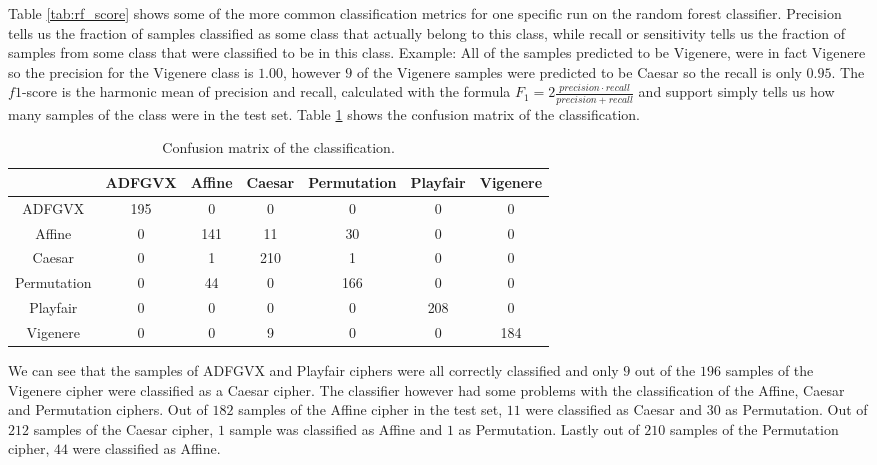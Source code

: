 \documentclass[a4paper]{article}
\begin{document}
Table \ref{tab:rf_score} shows some of the more common classification metrics for one specific run on the random forest classifier. Precision tells us the fraction of samples classified as some class that actually belong to this class, while recall or sensitivity tells us the fraction of samples from some class that were classified to be in this class. Example: All of the samples predicted to be Vigenere, were in fact Vigenere so the precision for the Vigenere class is $1.00$, however $9$ of the Vigenere samples were predicted to be Caesar so the recall is only $0.95$. The $f1$-score is the harmonic mean of precision and recall, calculated with the formula $F_{1} = 2 \frac{precision \cdot recall}{precision + recall}$ and support simply tells us how many samples of the class were in the test set. Table \ref{tab:conf_matrix} shows the confusion matrix of the classification.

\begin{table}[H]
  \begin{center}
    \begin{tabular}{| c | c | c | c | c | c | c |}
      \hline
      				&ADFGVX &Affine &Caesar &Permutation &Playfair &Vigenere\\
      \hline
      ADFGVX		&195	&0		&0	    &0			 &0		   &0\\
      \hline
      Affine		&0		&141	&11	    &30 		 &0 	   &0\\
      \hline
      Caesar      	&0		&1		&210	&1	 		 &0 	   &0\\
      \hline
      Permutation   &0		&44		&0		&166 		 &0		   &0\\
      \hline
      Playfair      &0		&0		&0		&0	 		 &208 	   &0\\
      \hline
      Vigenere      &0	    &0		&9		&0	 		 &0 	   &184\\
      \hline
    \end{tabular}
  \end{center}
  \caption{Confusion matrix of the classification.}
  \label{tab:conf_matrix}
\end{table}

We can see that the samples of ADFGVX and Playfair ciphers were all correctly classified and only $9$ out of the $196$ samples of the Vigenere cipher were classified as a Caesar cipher. The classifier however had some problems with the classification of the Affine, Caesar and Permutation ciphers. Out of $182$ samples of the Affine cipher in the test set, $11$ were classified as Caesar and $30$ as Permutation. Out of $212$ samples of the Caesar cipher, $1$ sample was classified as Affine and $1$ as Permutation. Lastly out of $210$ samples of the Permutation cipher, $44$ were classified as Affine.
\end{document}
